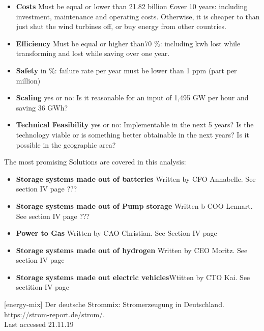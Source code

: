 \begin{parcolumns}[colwidths={1=2.5 cm, 2=10 cm, 3=2.5cm}]{3}
{\begin{itemize}
\item \textbf{Costs} Must be equal or lower than 21.82 billion \euro over 10 years: including investment, maintenance and operating costs. Otherwise, it is cheaper to than just shut the wind turbines off, or buy energy from other countries.
\item \textbf{Efficiency} Must be equal or higher than70 $\%$: including kwh lost while transforming and lost while saving over one year.
\item \textbf{Safety} in $\%$: failure rate per year must be lower than 1 ppm (part per million)
\item \textbf{Scaling} yes or no: Is it reasonable for an input of 1,495 GW per hour and saving 36 GWh? 
\item \textbf{Technical Feasibility} yes or no: Implementable in the next 5 years? Is the technology viable or is something better obtainable in the next years? Is it possible in the geographic area?  
\\
\end{itemize}
The most promising Solutions are covered in this analysis:
\begin{itemize}
\item \textbf{Storage systems made out of batteries} \newline Written by CFO Annabelle. See section IV page ???
\item \textbf{Storage systems made out of Pump storage} \newline Written b COO Lennart. See section IV page ???
\item \textbf{Power to Gas} \newline Written by CAO Christian. See Section IV page \pageref{PumpedStorageHydropower_Lennart}
\item \textbf{Storage systems made out of hydrogen} \newline Written by CEO Moritz. See section IV page \pageref{H2_Moritz}
\item \textbf{Storage systems made out electric vehicles}\newline Wtitten by CTO Kai. See sectition IV page \pageref{V2G_Kai}
\\
\end{itemize}
[energy-mix]  Der deutsche Strommix: Stromerzeugung in Deutschland. \\https://strom-report.de/strom/.\\Last accessed 21.11.19


}


\end{parcolumns}